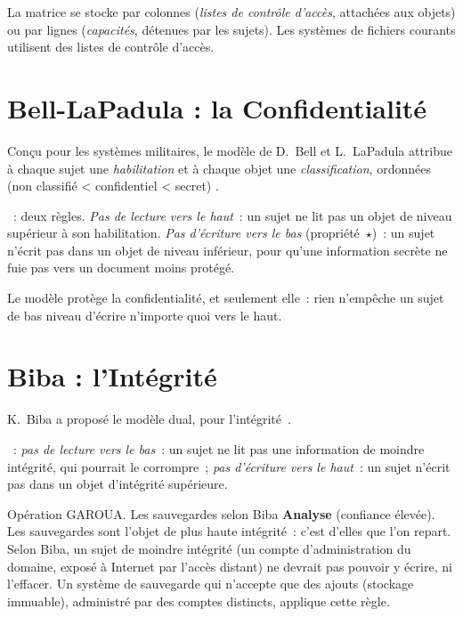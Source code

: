 La matrice se stocke par colonnes (\emph{listes de contrôle d'accès},
attachées aux objets) ou par lignes (\emph{capacités}, détenues par les
sujets). Les systèmes de fichiers courants utilisent des listes de
contrôle d'accès.

\section{Bell-LaPadula : la Confidentialité}
\label{sec:c13-blp}

Conçu pour les systèmes militaires, le modèle de D.~Bell et L.~LaPadula
attribue à chaque sujet une \emph{habilitation} et à chaque objet une
\emph{classification}, ordonnées (non classifié < confidentiel < secret)
\cite{bell1976}.

\begin{boxdef}
~: deux règles. \emph{Pas de lecture vers le
haut}~: un sujet ne lit pas un objet de niveau supérieur à son
habilitation. \emph{Pas d'écriture vers le bas} (propriété~\(\star\))~:
un sujet n'écrit pas dans un objet de niveau inférieur, pour qu'une
information secrète ne fuie pas vers un document moins protégé.
\end{boxdef}

Le modèle protège la confidentialité, et seulement elle~: rien n'empêche
un sujet de bas niveau d'écrire n'importe quoi vers le haut.

\section{Biba : l'Intégrité}
\label{sec:c13-biba}

K.~Biba a proposé le modèle dual, pour l'intégrité~\cite{biba1977}.

\begin{boxdef}
~: \emph{pas de lecture vers le bas}~: un sujet ne lit pas
une information de moindre intégrité, qui pourrait le corrompre~; \emph{pas
d'écriture vers le haut}~: un sujet n'écrit pas dans un objet d'intégrité
supérieure.
\end{boxdef}

\begin{boxscenario}{Opération GAROUA. Les sauvegardes selon Biba}
\textbf{Analyse} (confiance élevée). Les sauvegardes sont l'objet de plus
haute intégrité~: c'est d'elles que l'on repart. Selon Biba, un sujet de
moindre intégrité (un compte d'administration du domaine, exposé à
Internet par l'accès distant) ne devrait pas pouvoir y écrire, ni
l'effacer. Un système de sauvegarde qui n'accepte que des ajouts
(stockage immuable), administré par des comptes distincts, applique cette
règle.
\end{boxscenario}

